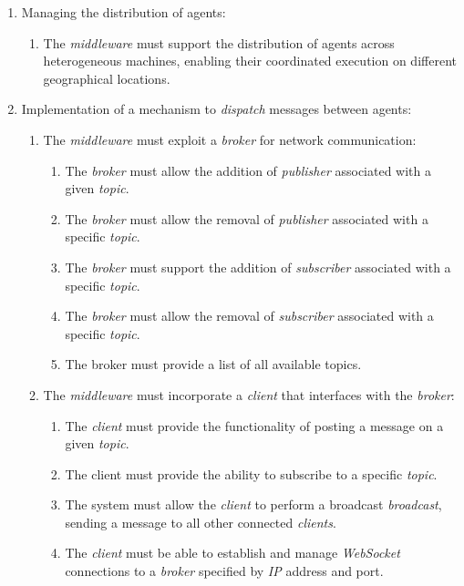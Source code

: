 \begin{enumerate}
      \item Managing the distribution of agents:
      \begin{enumerate}
            \item The \textit{middleware} must support the distribution of agents across heterogeneous machines,
            enabling their coordinated execution on different geographical locations.
      \end{enumerate}

      \item Implementation of a mechanism to \textit{dispatch} messages between agents:
      \begin{enumerate}
            \item The \textit{middleware} must exploit a \textit{broker} for network communication:
            \begin{enumerate}
                  \item The \textit{broker} must allow the addition of \textit{publisher} associated with a given \textit{topic}.
                  \item The \textit{broker} must allow the removal of \textit{publisher} associated with a specific \textit{topic}.
                  \item The \textit{broker} must support the addition of \textit{subscriber} associated with a specific \textit{topic}.
                  \item The \textit{broker} must allow the removal of \textit{subscriber} associated with a specific \textit{topic}.
                  \item The broker must provide a list of all available topics.
            \end{enumerate}
            \item The \textit{middleware} must incorporate a \textit{client} that interfaces with the \textit{broker}:
            \begin{enumerate}
                  \item The \textit{client} must provide the functionality of posting a message on a given \textit{topic}.
                  \item The client must provide the ability to subscribe to a specific \textit{topic}.
                  \item The system must allow the \textit{client} to perform a broadcast \textit{broadcast}, sending a message to all other connected \textit{clients}.
                  \item The \textit{client} must be able to establish and manage \textit{WebSocket} connections to a \textit{broker} specified by \textit{IP} address and port.

\end{enumerate}
\end{enumerate}
\end{enumerate}
